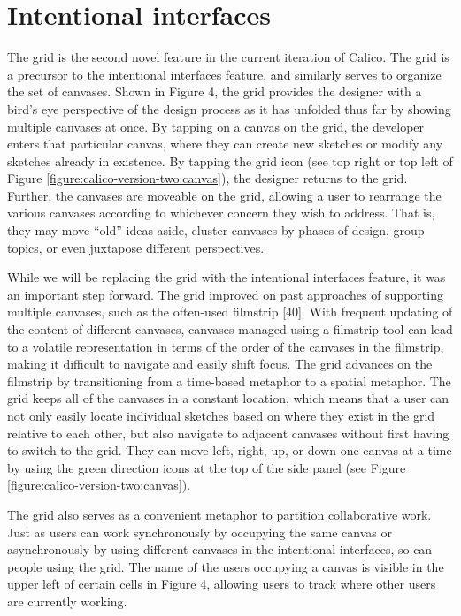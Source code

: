 \section{Intentional interfaces}

The grid is the second novel feature in the current iteration of Calico. The grid is a precursor to the intentional interfaces feature, and similarly serves to organize the set of canvases. Shown in Figure 4, the grid provides the designer with a bird’s eye perspective of the design process as it has unfolded thus far by showing multiple canvases at once. By tapping on a canvas on the grid, the developer enters that particular canvas, where they can create new sketches or modify any sketches already in existence. By tapping the grid icon (see top right or top left of Figure \ref{figure:calico-version-two:canvas}), the designer returns to the grid. Further, the canvases are moveable on the grid, allowing a user to rearrange the various canvases according to whichever concern they wish to address. That is, they may move ``old'' ideas aside, cluster canvases by phases of design, group topics, or even juxtapose different perspectives.

While we will be replacing the grid with the intentional interfaces feature, it was an important step forward. The grid improved on past approaches of supporting multiple canvases, such as the often-used filmstrip [40]. With frequent updating of the content of different canvases, canvases managed using a filmstrip tool can lead to a volatile representation in terms of the order of the canvases in the filmstrip, making it difficult to navigate and easily shift focus. The grid advances on the filmstrip by transitioning from a time-based metaphor to a spatial metaphor. The grid keeps all of the canvases in a constant location, which means that a user can not only easily locate individual sketches based on where they exist in the grid relative to each other, but also navigate to adjacent canvases without first having to switch to the grid. They can move left, right, up, or down one canvas at a time by using the green direction icons at the top of the side panel (see Figure \ref{figure:calico-version-two:canvas}). 

The grid also serves as a convenient metaphor to partition collaborative work. Just as users can work synchronously by occupying the same canvas or asynchronously by using different canvases in the intentional interfaces, so can people using the grid. The name of the users occupying a canvas is visible in the upper left of certain cells in Figure 4, allowing users to track where other users are currently working. 
  
